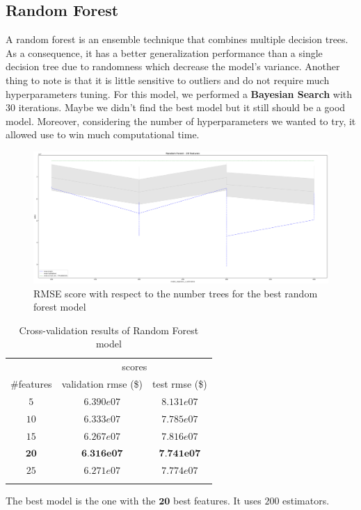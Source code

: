 \subsection{Random Forest}

A random forest is an ensemble technique that combines multiple decision trees. As a consequence, it has a better generalization performance than a single decision tree due to randomness which decrease the model's variance. Another thing to note is that it is little sensitive to outliers and do not require much hyperparameters tuning. For this model, we performed a \textbf{Bayesian Search} with $30$ iterations. Maybe we didn't find the best model but it still should be a good model. Moreover, considering the number of hyperparameters we wanted to try, it allowed use to win much computational time. 

\begin{figure}[H]
	\centering
	\includegraphics{figures/rf_eval.pdf}
	\caption{RMSE score with respect to the number trees for the best random forest model}
	\label{fig:rf_eval}
\end{figure}

\begin{table}[H]
	\centering
	\begin{tabular}{ccc} \toprule
	  & \multicolumn {2}{c}{scores} \\\cmidrule(lr) {2-3}
	  \#features         & validation rmse (\$)             & test rmse (\$) \\\hline
	  $5$        		& $6.390e07	$                      	& $8.131e07$ \\
	  $10$        		& $6.333e07$                        & $7.785e07$ \\
	  $15$        		& $6.267e07$                        & $7.816e07$ \\
	  $\textbf{20}$             	& $\textbf{6.316e07}$                        & $\textbf{7.741e07}$ \\
	  $25$             	& $6.271e07$                        & $7.774e07$ \\
	  \\\hline
	\end{tabular}
	\caption{Cross-validation results of Random Forest model}
	\label{tab:rf-results}
\end{table}

The best model is the one with the $\textbf{20}$ best features. It uses $200$ estimators.